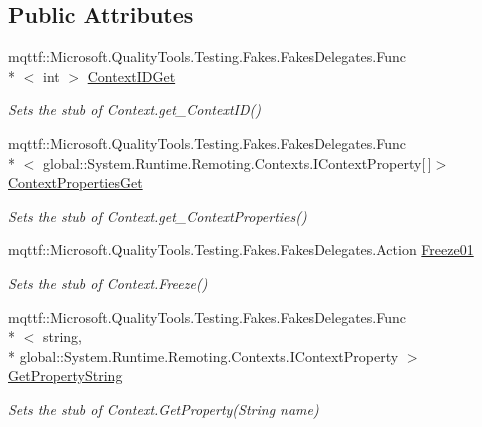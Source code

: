 \subsection*{Public Attributes}
\begin{DoxyCompactItemize}
\item 
mqttf\-::\-Microsoft.\-Quality\-Tools.\-Testing.\-Fakes.\-Fakes\-Delegates.\-Func\\*
$<$ int $>$ \hyperlink{class_system_1_1_runtime_1_1_remoting_1_1_contexts_1_1_fakes_1_1_stub_context_ae0e43bd93dbccbd32f146780219916a2}{Context\-I\-D\-Get}
\begin{DoxyCompactList}\small\item\em Sets the stub of Context.\-get\-\_\-\-Context\-I\-D()\end{DoxyCompactList}\item 
mqttf\-::\-Microsoft.\-Quality\-Tools.\-Testing.\-Fakes.\-Fakes\-Delegates.\-Func\\*
$<$ global\-::\-System.\-Runtime.\-Remoting.\-Contexts.\-I\-Context\-Property\mbox{[}$\,$\mbox{]}$>$ \hyperlink{class_system_1_1_runtime_1_1_remoting_1_1_contexts_1_1_fakes_1_1_stub_context_a63cd05d27269a804e59e2c7a32327797}{Context\-Properties\-Get}
\begin{DoxyCompactList}\small\item\em Sets the stub of Context.\-get\-\_\-\-Context\-Properties()\end{DoxyCompactList}\item 
mqttf\-::\-Microsoft.\-Quality\-Tools.\-Testing.\-Fakes.\-Fakes\-Delegates.\-Action \hyperlink{class_system_1_1_runtime_1_1_remoting_1_1_contexts_1_1_fakes_1_1_stub_context_aa63812b1bc17fbfd86883e90fa9475e4}{Freeze01}
\begin{DoxyCompactList}\small\item\em Sets the stub of Context.\-Freeze()\end{DoxyCompactList}\item 
mqttf\-::\-Microsoft.\-Quality\-Tools.\-Testing.\-Fakes.\-Fakes\-Delegates.\-Func\\*
$<$ string, \\*
global\-::\-System.\-Runtime.\-Remoting.\-Contexts.\-I\-Context\-Property $>$ \hyperlink{class_system_1_1_runtime_1_1_remoting_1_1_contexts_1_1_fakes_1_1_stub_context_a1ec7098f1e8505b46754adfd58df16ec}{Get\-Property\-String}
\begin{DoxyCompactList}\small\item\em Sets the stub of Context.\-Get\-Property(\-String name)\end{DoxyCompactList}\item 

\end{DoxyCompactItemize}
